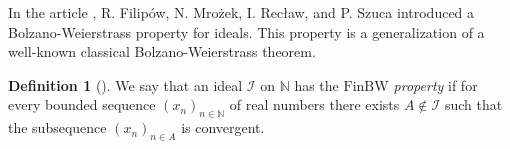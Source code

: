\documentclass{amsart}
\theoremstyle{definition}
\newtheorem{df}[thm]{Definition}
\theoremstyle{definition}
\newcommand{\N}{{\mathbb N}}
\newcommand{\Fin}{\textrm{Fin}}
\newcommand{\I}{\mathcal I}
\newcommand{\bw}{\text{BW}}
\newcommand{\finbw}{\text{FinBW}}
\begin{document}
In the article \cite{H1}, R. Filip\'ow, N. Mro\.zek, I. Rec\l{}aw, and P. Szuca introduced a Bolzano-Weierstrass property 
for ideals. This property is a generalization of a well-known classical Bolzano-Weierstrass theorem.


\begin{df}[\cite{H1}]
We say that an ideal $\I$ on $\N$ has the \emph{$\finbw$ property} if for every bounded sequence $(x_n)_{n\in\N}$ of real numbers there exists $A\notin\I$ such that the subsequence $(x_n)_{n\in A}$ is convergent.
\end{df}

\end{document}
